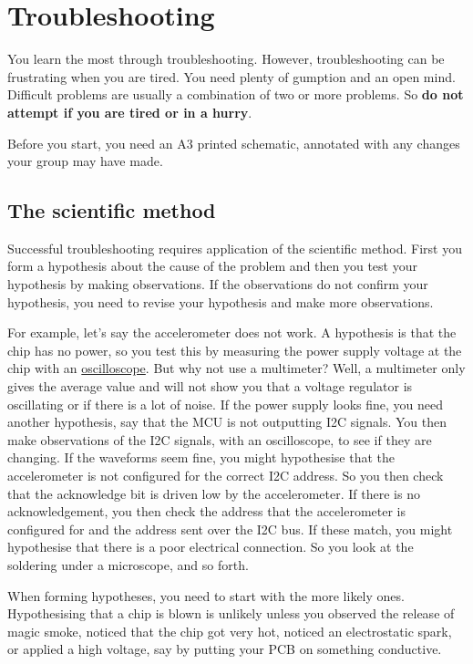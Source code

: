 \chapter{Troubleshooting}
\label{troubleshooting}

You learn the most through troubleshooting.  However, troubleshooting
can be frustrating when you are tired. You need plenty of gumption and
an open mind. Difficult problems are usually a combination of two or
more problems. So \textbf{do not attempt if you are tired or in a
  hurry}.

Before you start, you need an A3 printed schematic, annotated with
any changes your group may have made.


\section{The scientific method}

Successful troubleshooting requires application of the scientific
method.  First you form a hypothesis about the cause of the problem
and then you test your hypothesis by making observations.  If the
observations do not confirm your hypothesis, you need to revise your
hypothesis and make more observations.

For example, let's say the accelerometer does not work.  A hypothesis is that
the chip has no power, so you test this by measuring the power supply
voltage at the chip with an \hyperref[oscilloscope]{oscilloscope}.
But why not use a multimeter?  Well, a multimeter only gives the
average value and will not show you that a voltage regulator is
oscillating or if there is a lot of noise.  If the power supply looks
fine, you need another hypothesis, say that the MCU is not outputting
I2C signals.  You then make observations of the I2C signals, with an
oscilloscope, to see if they are changing.  If the waveforms seem
fine, you might hypothesise that the accelerometer is not configured for the
correct I2C address.  So you then check that the acknowledge bit is
driven low by the accelerometer.  If there is no acknowledgement, you then check
the address that the accelerometer is configured for and the address sent over
the I2C bus.  If these match, you might hypothesise that there is a
poor electrical connection.  So you look at the soldering under a
microscope, and so forth.

When forming hypotheses, you need to start with the more likely ones.
Hypothesising that a chip is blown is unlikely unless you observed the
release of magic smoke, noticed that the chip got very hot, noticed an
electrostatic spark, or applied a high voltage, say by putting your
PCB on something conductive.

